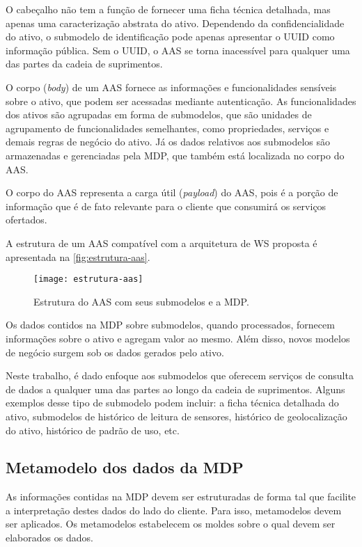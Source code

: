 	O cabeçalho não tem a função de fornecer uma ficha técnica detalhada, mas apenas uma caracterização abstrata do ativo. Dependendo da confidencialidade do ativo, o submodelo de identificação pode apenas apresentar o UUID como informação pública. Sem o UUID, o AAS se torna inacessível para qualquer uma das partes da cadeia de suprimentos.
	
	O corpo (\textit{body}) de um AAS fornece as informações e funcionalidades sensíveis sobre o ativo, que podem ser acessadas mediante autenticação. As funcionalidades dos ativos são agrupadas em forma de submodelos, que são unidades de agrupamento de funcionalidades semelhantes, como propriedades, serviços e demais regras de negócio do ativo. Já os dados relativos aos submodelos são armazenadas e gerenciadas pela MDP, que também está localizada no corpo do AAS.
	
	O corpo do AAS representa a carga útil (\textit{payload}) do AAS, pois é a porção de informação que é de fato relevante para o cliente que consumirá os serviços ofertados.
	
	A estrutura de um AAS compatível com a arquitetura de WS proposta é apresentada na \autoref{fig:estrutura-aas}.
	
	\begin{figure}[htb]
		\centering
		\caption{Estrutura do AAS com seus submodelos e a MDP.}
		\label{fig:estrutura-aas}
		\texttt{[image: estrutura-aas]}
	\end{figure}

	Os dados contidos na MDP sobre submodelos, quando processados, fornecem informações sobre o ativo e agregam valor ao mesmo. Além disso, novos modelos de negócio surgem sob os dados gerados pelo ativo.
	
	Neste trabalho, é dado enfoque aos submodelos que oferecem serviços de consulta de dados a qualquer uma das partes ao longo da cadeia de suprimentos. Alguns exemplos desse tipo de submodelo podem incluir: a ficha técnica detalhada do ativo, submodelos de histórico de leitura de sensores, histórico de geolocalização do ativo, histórico de padrão de uso, etc.

\subsection{ Metamodelo dos dados da MDP}	
	
	As informações contidas na MDP devem ser estruturadas de forma tal que facilite a interpretação destes dados do lado do cliente. Para isso, metamodelos devem ser aplicados. Os metamodelos estabelecem os moldes sobre o qual devem ser elaborados os dados.
	
